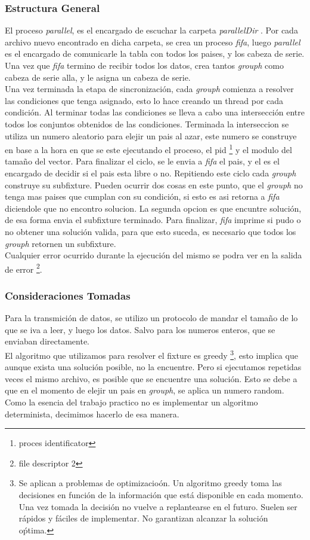 \documentclass[10pt,a4paper]{article}
\begin{document}
\subsubsection{Estructura General}
El proceso \textit{parallel}, es el encargado de escuchar la carpeta \textit{parallelDir} . Por cada archivo nuevo encontrado en dicha carpeta, se crea un proceso \textit{fifa}, luego \textit{parallel} es el encargado de comunicarle la tabla con todos los paises, y los cabeza de serie. Una vez que  \textit{fifa} termino de recibir todos los datos, crea tantos  \textit{grouph} como cabeza de serie alla, y le asigna un cabeza de serie.\\
Una vez terminada la etapa de sincronizaci\'on, cada  \textit{grouph} comienza a resolver las condiciones que tenga asignado, esto lo hace creando un thread por cada condici\'on. Al terminar todas las condiciones se lleva a cabo una intersecci\'on entre todos los conjuntos obtenidos de las condiciones. Terminada la interseccion se utiliza un numero aleatorio para elejir un pais al azar, este numero se construye en base a la hora en que se este ejecutando el proceso, el pid \footnote{proces identificator} y el modulo del tama\~no del vector. Para finalizar el ciclo, se le envia  a  \textit{fifa} el pais, y el es el encargado de decidir si el pais esta libre o no. Repitiendo este ciclo cada  \textit{grouph} construye su subfixture. Pueden ocurrir dos cosas en este punto, que el  \textit{grouph} no tenga mas paises que cumplan con su condici\'on, si esto es asi retorna a  \textit{fifa} diciendole que no encontro solucion. La segunda opcion es que encuntre soluci\'on, de esa forma envia el subfixture terminado.
Para finalizar,  \textit{fifa} imprime si pudo o no obtener una soluci\'on valida, para que esto suceda, es necesario que todos los  \textit{grouph} retornen un subfixture.\\
Cualquier error ocurrido durante la ejecuci\'on del mismo se podra ver en la salida de error \footnote{ file descriptor 2}.

\subsubsection{Consideraciones Tomadas}
Para la transmici\'on de datos, se utilizo un protocolo de mandar el tama\~no de lo que se iva a leer, y luego los datos. Salvo para los numeros enteros, que se enviaban directamente.\\
El algoritmo que utilizamos para resolver el fixture es greedy \footnote{Se aplican a problemas de optimizacio\'on. Un algoritmo greedy toma las decisiones en funci\'on de la informaci\'on que est\'a disponible en cada momento. Una vez tomada la decisi\'on no vuelve a replantearse en el futuro. Suelen ser r\'apidos y f\'aciles de implementar. No garantizan alcanzar la soluci\'on o\'ptima.}, esto implica que aunque exista una soluci\'on posible, no la encuentre. Pero si ejecutamos repetidas veces el mismo archivo, es posible que se encuentre una soluci\'on. Esto se debe a que en el momento de elejir un pais en \textit{grouph}, se aplica un numero random. Como la esencia del trabajo practico no es implementar un algoritmo determinista, decimimos hacerlo de esa manera. 
\end{document}
